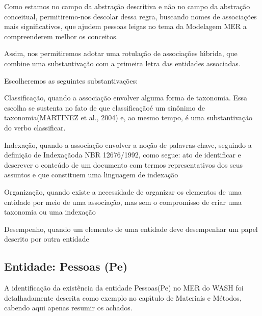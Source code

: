 \documentclass[
12pt,		%
openright,	%
twoside,  %
a4paper,			%
chapter=TITLE,		%
english,			%
french,				%
spanish,			%
brazil				%
]{USPSC-classe/USPSC}
\begin{document}
Como estamos no campo da abstra\c{c}\~ao descritiva e n\~ao no campo da abstra\c{c}\~ao conceitual, permitiremo-nos descolar dessa regra, buscando nomes de associa\c{c}\~oes mais significativos, que ajudem pessoas leigas no tema da Modelagem MER a compreenderem melhor os conceitos.










Assim, nos permitiremos adotar uma rotula\c{c}\~ao de associa\c{c}\~oes h\'{\i}brida, que combine uma substantiva\c{c}\~ao com a primeira letra das entidades associadas.










Escolheremos as seguintes substantiva\c{c}\~oes:











\begin{alineas}
\item Classifica\c{c}\~ao, quando a associa\c{c}\~ao envolver alguma forma de taxonomia. Essa escolha se sustenta no fato de que \textquotedbl classifica\c{c}\~ao\textquotedbl  \'e um sin\^onimo de \textquotedbl taxonomia\textquotedbl   (MARTINEZ et al., 2004) e, ao mesmo tempo, \'e uma substantiva\c{c}\~ao do verbo classificar.
\item Indexa\c{c}\~ao, quando a associa\c{c}\~ao envolver a no\c{c}\~ao de palavras-chave, seguindo a defini\c{c}\~ao de \textquotedbl Indexa\c{c}\~ao\textquotedbl  da NBR 12676/1992, como segue: \textquotedbl ato de identificar e descrever o conte\'udo de um documento com termos representativos dos seus assuntos e que constituem uma linguagem de indexa\c{c}\~ao\textquotedbl 
\item Organiza\c{c}\~ao, quando existe a necessidade de organizar os elementos de uma entidade por meio de uma associa\c{c}\~ao, mas sem o compromisso de criar uma taxonomia ou uma indexa\c{c}\~ao
\item Desempenho, quando um elemento de uma entidade deve desempenhar um papel descrito por outra entidade
\end{alineas}

\subsection[Entidade: Pessoas (Pe)]{Entidade: Pessoas (Pe)}\label{Entidade: Pessoas (Pe)}
A identifica\c{c}\~ao da exist\^encia da entidade \textquotedbl Pessoas\textquotedbl  (Pe) no MER do WASH foi detalhadamente descrita como exemplo no cap\'{\i}tulo de Materiais e M\'etodos, cabendo aqui apenas resumir os achados.
\end{document}

